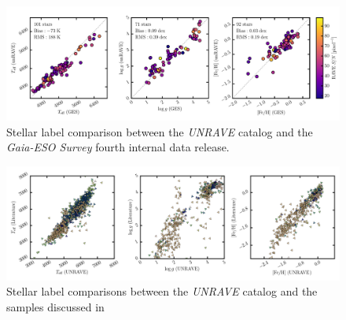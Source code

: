 \documentclass[preprint,trackchanges]{aastex}
\newcommand{\project}[1]{\textsl{#1}}
\begin{document}
\begin{figure}[p]
\includegraphics[width=\textwidth]{figures/ges-comparison.pdf}
\caption{Stellar label comparison between the \project{UNRAVE} catalog and the \project{Gaia-ESO Survey} fourth internal data release.\label{fig:ges-dr4-comparison}}
\end{figure}

\begin{figure}[p]
\includegraphics[width=\textwidth]{figures/literature-comparison.png}
\caption{Stellar label comparisons between the \project{UNRAVE} catalog and the samples discussed in \citep{Kordopatis_2013}}
\end{figure}
\end{document}
